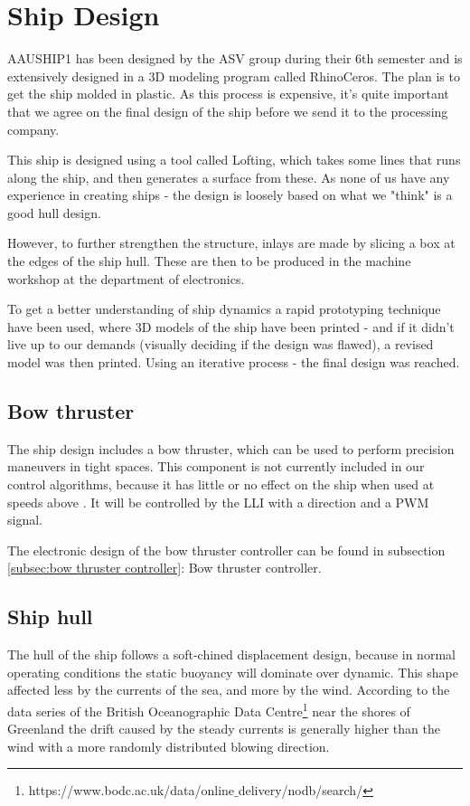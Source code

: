\chapter{Ship Design}
AAUSHIP1 has been designed by the ASV group during their 6th semester and is extensively designed in a 3D modeling program called RhinoCeros. The plan is to get the ship molded in plastic. As this process is expensive, it's quite important that we agree on the final design of the ship before we send it to the processing company. 

This ship is designed using a tool called Lofting, which takes some lines that runs along the ship, and then generates a surface from these. As none of us have any experience in creating ships - the design is loosely based on what we "think" is a good hull design. 

However, to further strengthen the structure, inlays are made by slicing a box at the edges of the ship hull. These are then to be produced in the machine workshop at the department of electronics. 

To get a better understanding of ship dynamics a rapid prototyping technique have been used, where 3D models of the ship have been printed - and if it didn't live up to our demands (visually deciding if the design was flawed), a revised model was then printed. Using an iterative process - the final design was reached.

\section{Bow thruster}
The ship design includes a bow thruster, which can be used to perform precision maneuvers in tight spaces. This component is not currently included in our control algorithms, because it has little or no effect on the ship when used at speeds above . It will be controlled by the \ac{LLI} with a direction and a \ac{PWM} signal. 

The electronic design of the bow thruster controller can be found in subsection \ref{subsec:bow thruster controller}: Bow thruster controller.

\section{Ship hull}

The hull of the ship follows a soft-chined displacement design, because in normal operating conditions the static buoyancy will dominate over dynamic. This shape affected less by the currents of the sea, and more by the wind. According to the data series of the British Oceanographic Data Centre\footnote[1]{https://www.bodc.ac.uk/data/online$\_$delivery/nodb/search/} near the shores of Greenland the drift caused by the steady currents is generally higher than the wind with a more randomly distributed blowing direction.

